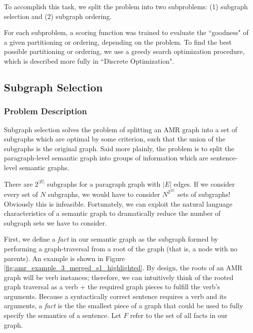 \documentclass[12pt]{article}
\begin{document}
To accomplish this task, we split the problem into two subproblems: (1)
subgraph selection and (2) subgraph ordering.

For each subproblem, a scoring function was trained to evaluate the ``goodness" of
a given partitioning or ordering, depending on the problem. To find the best
possible partitioning or ordering, we use a greedy search optimization
procedure, which is described more fully in ``Discrete Optimization".

\subsection{Subgraph Selection}
\subsubsection{Problem Description}

Subgraph selection solves the problem of splitting an AMR graph into a set of
subgraphs which are optimal by some criterion, such that the union of the
subgraphs is the original graph. Said more plainly, the problem is to split the paragraph-level semantic graph into groups of information
which are sentence-level semantic graphs.

There are $2^{|E|}$ subgraphs for a paragraph graph with $|E|$ edges. If we consider every set of $N$ subgraphs, we would have to consider $N^{2^{|E|}}$ sets of subgraphs! Obviously this is infeasible. Fortunately, we can exploit the natural language characteristics of a semantic graph to dramatically reduce the number of subgraph sets we have to consider. 

First, we define a {\em fact} in our semantic graph as the subgraph formed by performing a graph-traversal from a root of the graph (that is, a node with no parents). An example is shown in Figure \ref{fig:amr_example_3_merged_s1_highlighted}. By design, the roots of an AMR graph will be verb instances; therefore, we can intuitively think of the rooted graph traversal as a verb + the required graph pieces to fulfill the verb's arguments. Because a syntactically correct sentence requires a verb and its arguments, a {\em fact} is the the smallest piece of a graph that could be used to fully specify the semantics of a sentence. Let $F$ refer to the set of all facts in our graph.
\end{document}
